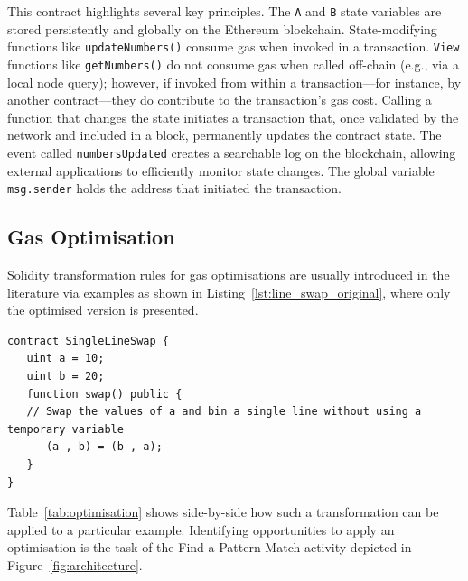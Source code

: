 \documentclass[manuscript,screen,review]{acmart}
\begin{document}
This contract highlights several key principles. The \texttt{A} and \texttt{B} state variables are stored persistently and globally on the Ethereum blockchain. State-modifying functions like \texttt{updateNumbers()} consume gas when invoked in a transaction. \texttt{View} functions like \texttt{getNumbers()} do not consume gas when called off-chain (e.g., via a local node query); however, if invoked from within a transaction---for instance, by another contract---they do contribute to the transaction's gas cost. Calling a function that changes the state initiates a transaction that, once validated by the network and included in a block, permanently updates the contract state. The event called \texttt{numbersUpdated} creates a searchable log on the blockchain, allowing external applications to efficiently monitor state changes. The global variable \texttt{msg.sender} holds the address that initiated the transaction.

\subsection{Gas Optimisation}
\label{sec:gas_optimisation}

Solidity transformation rules for gas optimisations are usually introduced in the literature via examples as shown in Listing~\ref{lst:line_swap_original}, where only the optimised version is presented.

\begin{listing}[htb]
\begin{scriptsize}
\begin{verbatim}
contract SingleLineSwap {
   uint a = 10;
   uint b = 20;
   function swap() public {
   // Swap the values of a and bin a single line without using a temporary variable
      (a , b) = (b , a);
   }
}
\end{verbatim}
\end{scriptsize}
\caption{Line swap gas optimisation as introduced by Khanzadeh~{\em et al.\/}~\cite{khanzadeh2023optimizing}.}
\label{lst:line_swap_original}
\end{listing}

Table~\ref{tab:optimisation} shows side-by-side how such a transformation can be applied to a particular example. Identifying opportunities to apply an optimisation is the task of the \textsf{Find a Pattern Match} activity depicted in Figure~\ref{fig:architecture}.
\end{document}
